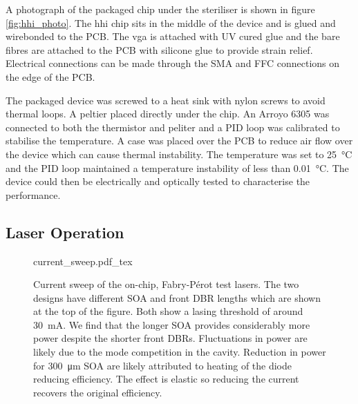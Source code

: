 A photograph of the packaged chip under the steriliser is shown in figure \ref{fig:hhi_photo}. The \ac{hhi} chip sits in the middle of the device and is glued and wirebonded to the PCB. The \ac{vga} is attached with UV cured glue and the bare fibres are attached to the PCB with silicone glue to provide strain relief. Electrical connections can be made through the SMA and FFC connections on the edge of the PCB.

The packaged device was screwed to a heat sink with nylon screws to avoid thermal loops. A peltier placed directly under the chip. An Arroyo 6305 was connected to both the thermistor and peliter and a PID loop was calibrated to stabilise the temperature. A case was placed over the PCB to reduce air flow over the device which can cause thermal instability. The temperature was set to \SI{25}{\celsius} and the PID loop maintained a temperature instability of less than \SI{0.01}{\celsius}. The device could then be electrically and optically tested to characterise the performance.

\subsection{Laser Operation}

\begin{figure}[t]
	\centering
	\small	
	\def\svgwidth{\textwidth} 
	{current_sweep.pdf_tex}
	\caption[Current sweep of the HHI Fabry-P\'{e}rot test lasers]{Current sweep of the on-chip, Fabry-P\'{e}rot test lasers. The two designs have different \acs{SOA} and front \acs{DBR} lengths which are shown at the top of the figure. Both show a lasing threshold of around \SI{30}{\mA}. We find that the longer \acs{SOA} provides considerably more power despite the shorter front \acsp{DBR}. Fluctuations in power are likely due to the mode competition in the cavity. Reduction in power for \SI{300}{\um} \acs{SOA} are likely attributed to heating of the diode reducing efficiency. The effect is elastic so reducing the current recovers the original efficiency.}
	\label{fig:hhi_soa_sweep}
\end{figure}

